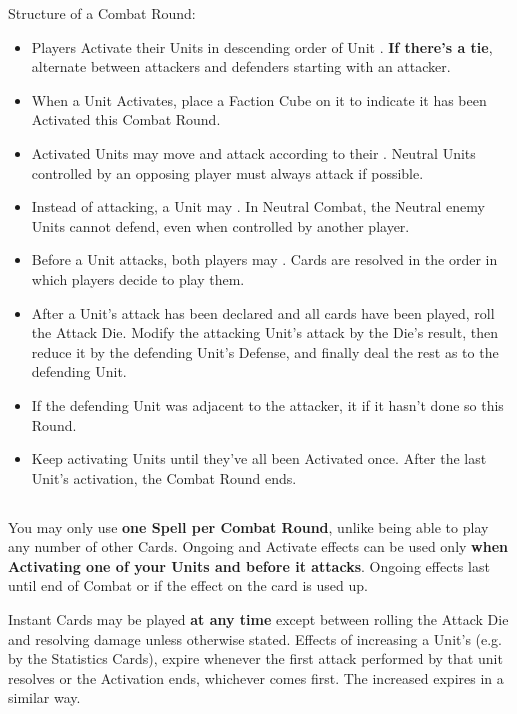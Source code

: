\begin{multicols*}{2}
Structure of a Combat Round:
\begin{itemize}
  \item Players Activate their Units in descending order of Unit . \textbf{If there's a tie}, alternate between attackers and defenders starting with an attacker.
  \item When a Unit Activates, place a Faction Cube on it to indicate it has been Activated this Combat Round.
  \item Activated Units may move and attack according to their . Neutral Units controlled by an opposing player must always attack if possible.
  \item Instead of attacking, a Unit may .
  In Neutral Combat, the Neutral enemy Units cannot defend, even when controlled by another player.
  \item Before a Unit attacks, both players may . Cards are resolved in the order in which players decide to play them.
  \item After a Unit's attack has been declared and all cards have been played, roll the Attack Die.
    Modify the attacking Unit's attack by the Die's result, then reduce it by the defending Unit's Defense, and finally deal the rest as  to the defending Unit.
  \item If the defending Unit was adjacent to the attacker, it  if it hasn't done so this Round.
  \item Keep activating Units until they've all been Activated once.
After the last Unit's activation, the Combat Round ends.
\end{itemize}
\vspace*{\fill}

\subsection*{}
You may only use \textbf{one Spell per Combat Round}, unlike being able to play any number of other Cards.
Ongoing  and  Activate effects can be used only \textbf{when Activating one of your Units and before it attacks}.
Ongoing effects last until end of Combat or if the effect on the card is used up.\par
Instant  Cards may be played \textbf{at any time} except between rolling the Attack Die and resolving damage unless otherwise stated.
Effects of increasing a Unit's  (e.g. by the Statistics Cards), expire whenever the first attack performed by that unit resolves or the Activation ends, whichever comes first.
The increased  expires in a similar way.


\end{multicols*}

